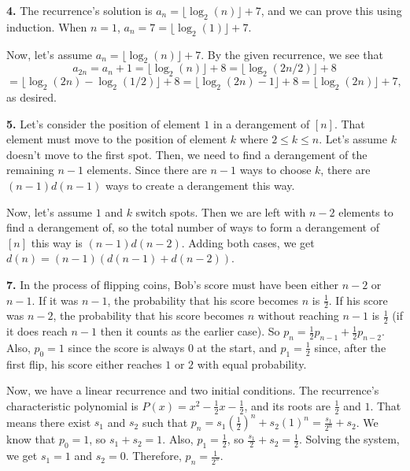 \documentclass{article}
\begin{document}
\textbf{4.} The recurrence's solution is $a_n = \lfloor\log_2(n)\rfloor + 7$, and we can prove this using induction. When $n = 1$, $a_n = 7 = \lfloor\log_2(1)\rfloor + 7$.
\newline

Now, let's assume $a_n = \lfloor\log_2(n)\rfloor + 7$. By the given recurrence, we see that $$a_{2n} = a_n + 1 = \lfloor\log_2(n)\rfloor + 8 = \lfloor\log_2(2n/2)\rfloor + 8$$$$ = \lfloor\log_2(2n) - \log_2(1/2)\rfloor + 8 = \lfloor\log_2(2n) - 1\rfloor + 8 = \lfloor\log_2(2n)\rfloor + 7,$$ as desired.
\newline

\textbf{5.} Let's consider the position of element $1$ in a derangement of $[n]$. That element must move to the position of element $k$ where $2 \le k \le n$. Let's assume $k$ doesn't move to the first spot. Then, we need to find a derangement of the remaining $n - 1$ elements. Since there are $n - 1$ ways to choose $k$, there are $(n - 1)d(n - 1)$ ways to create a derangement this way.
\newline

Now, let's assume $1$ and $k$ switch spots. Then we are left with $n - 2$ elements to find a derangement of, so the total number of ways to form a derangement of $[n]$ this way is $(n - 1)d(n - 2)$. Adding both cases, we get $d(n) = (n - 1)(d(n - 1) + d(n - 2))$.
\newline

\textbf{7.} In the process of flipping coins, Bob's score must have been either $n - 2$ or $n - 1$. If it was $n - 1$, the probability that his score becomes $n$ is $\frac{1}{2}$. If his score was $n - 2$, the probability that his score becomes $n$ without reaching $n - 1$ is $\frac{1}{2}$ (if it does reach $n - 1$ then it counts as the earlier case). So $p_n = \frac{1}{2}p_{n - 1} + \frac{1}{2}p_{n - 2}$. Also, $p_0 = 1$ since the score is always $0$ at the start, and $p_1 = \frac{1}{2}$ since, after the first flip, his score either reaches $1$ or $2$ with equal probability.
\newline

Now, we have a linear recurrence and two initial conditions. The recurrence's characteristic polynomial is $P(x) = x^2 - \frac{1}{2}x - \frac{1}{2}$, and its roots are $\frac{1}{2}$ and $1$. That means there exist $s_1$ and $s_2$ such that $p_n = s_1(\frac{1}{2})^n + s_2(1)^n = \frac{s_1}{2^n} + s_2$. We know that $p_0 = 1$, so $s_1 + s_2 = 1$. Also, $p_1 = \frac{1}{2}$, so $\frac{s_1}{2} + s_2 = \frac{1}{2}$. Solving the system, we get $s_1 = 1$ and $s_2 = 0$. Therefore, $p_n = \frac{1}{2^n}$.
\newline
\end{document}
